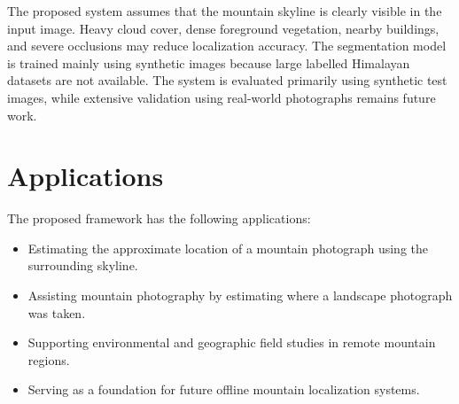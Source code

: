 The proposed system assumes that the mountain skyline is clearly visible in the input image. Heavy cloud cover, dense foreground vegetation, nearby buildings, and severe occlusions may reduce localization accuracy. The segmentation model is trained mainly using synthetic images because large labelled Himalayan datasets are not available. The system is evaluated primarily using synthetic test images, while extensive validation using real-world photographs remains future work.

\section{Applications}

The proposed framework has the following applications:

\begin{itemize}
    \item Estimating the approximate location of a mountain photograph using the surrounding skyline.
    \item Assisting mountain photography by estimating where a landscape photograph was taken.
    \item Supporting environmental and geographic field studies in remote mountain regions.
    \item Serving as a foundation for future offline mountain localization systems.
\end{itemize}
